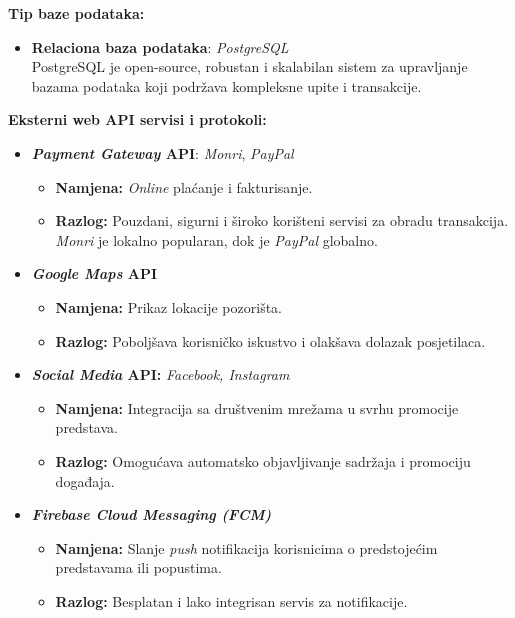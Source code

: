 \textbf{Tip baze podataka:}
\begin{itemize}  
    \item \textbf{Relaciona baza podataka}: \textit{PostgreSQL}\\
    PostgreSQL je open-source, robustan i skalabilan sistem za upravljanje bazama podataka koji podržava kompleksne upite i transakcije. 
    
\end{itemize} 
\textbf{Eksterni web API servisi i protokoli:}
\begin{itemize}  
    \item \textbf{\textit{Payment Gateway} API}: \textit{Monri}, \textit{PayPal}\begin{itemize}
        \item \textbf{Namjena:} \textit{Online} plaćanje i fakturisanje.
        \item \textbf{Razlog:} Pouzdani, sigurni i široko korišteni servisi za obradu transakcija. \textit{Monri} je lokalno popularan, dok je \textit{PayPal} globalno.
    \end{itemize}%
    \item \textbf{\textit{Google Maps} API} \begin{itemize}
        \item \textbf{Namjena:} Prikaz lokacije pozorišta.
        \item \textbf{Razlog:} Poboljšava korisničko iskustvo i olakšava dolazak posjetilaca.
    \end{itemize}
    \item \textbf{\textit{Social Media} API:} \textit{Facebook, Instagram} \begin{itemize}
        \item \textbf{Namjena:} Integracija sa društvenim mrežama u svrhu promocije predstava.
        \item \textbf{Razlog:} Omogućava automatsko objavljivanje sadržaja i promociju događaja.
    \end{itemize}
    \item \textbf{\textit{Firebase Cloud Messaging (FCM)}}\begin{itemize}
        \item \textbf{Namjena:} Slanje \textit{push} notifikacija korisnicima o predstojećim predstavama ili popustima.
        \item \textbf{Razlog:} Besplatan i lako integrisan servis za notifikacije.
    \end{itemize}

\end{itemize}
